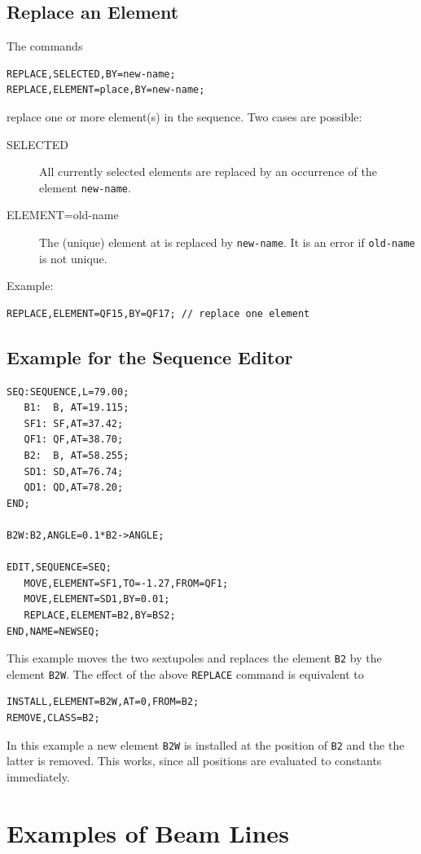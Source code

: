 \subsection{Replace an Element}
\label{sec:editreplace}
The commands
\begin{verbatim}
REPLACE,SELECTED,BY=new-name;
REPLACE,ELEMENT=place,BY=new-name;
\end{verbatim}
replace one or more element(s) in the sequence.
Two cases are possible:
\begin{description}
\item[SELECTED]
  All currently selected elements are replaced by an occurrence of the
  element \texttt{new-name}.
\item[ELEMENT=old-name]
  The (unique) element at  is replaced
  by \texttt{new-name}. 
  It is an error if \texttt{old-name} is not unique.
\end{description}
Example:
\begin{verbatim}
REPLACE,ELEMENT=QF15,BY=QF17; // replace one element
\end{verbatim}

\subsection{Example for the Sequence Editor}
\label{sec:editxmpl}
\begin{verbatim} 
SEQ:SEQUENCE,L=79.00;
   B1:  B, AT=19.115;
   SF1: SF,AT=37.42;
   QF1: QF,AT=38.70;
   B2:  B, AT=58.255;
   SD1: SD,AT=76.74;
   QD1: QD,AT=78.20;
END;

B2W:B2,ANGLE=0.1*B2->ANGLE;

EDIT,SEQUENCE=SEQ;
   MOVE,ELEMENT=SF1,TO=-1.27,FROM=QF1;
   MOVE,ELEMENT=SD1,BY=0.01;
   REPLACE,ELEMENT=B2,BY=BS2;
END,NAME=NEWSEQ;
\end{verbatim}
This example moves the two sextupoles and replaces the element \texttt{B2}
by the element \texttt{B2W}.
The effect of the above \texttt{REPLACE} command is equivalent to
\begin{verbatim}
INSTALL,ELEMENT=B2W,AT=0,FROM=B2;
REMOVE,CLASS=B2;
\end{verbatim}
In this example a new element \texttt{B2W} is installed at the position 
of \texttt{B2} and the the latter is removed.
This works, since all positions are evaluated to constants immediately.

\section{Examples of Beam Lines}


